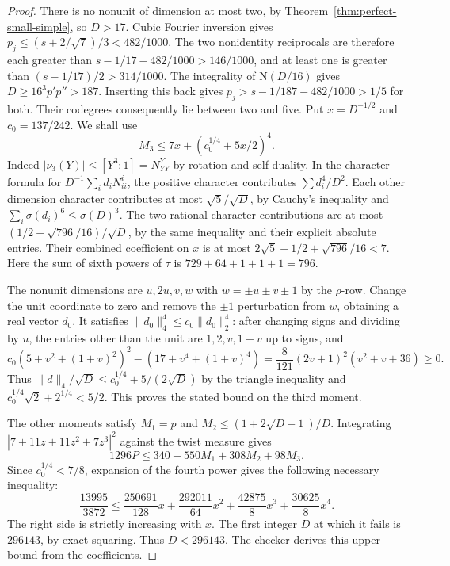 \documentclass[11pt,a4paper]{article}
\numberwithin{equation}{section}
\begin{document}
\begin{proof}
There is no nonunit of dimension at most two, by Theorem~\ref{thm:perfect-small-simple}, so $D>17$. Cubic Fourier inversion gives $p_j\le(s+2/\sqrt7)/3<482/1000$. The two nonidentity reciprocals are therefore each greater than $s-1/17-482/1000>146/1000$, and at least one is greater than $(s-1/17)/2>314/1000$. The integrality of $\mathrm N(D/16)$ gives $D\ge16^3p'p''>187$. Inserting this back gives $p_j>s-1/187-482/1000>1/5$ for both. Their codegrees consequently lie between two and five.
Put $x=D^{-1/2}$ and $c_0=137/242$. We shall use
\[
 M_3\le 7x+(c_0^{1/4}+5x/2)^4 .
\]
Indeed $|\nu_3(Y)|\le [Y^3:1]=N_{YY}^Y$ by rotation and
self-duality. In the character formula for
$D^{-1}\sum_i d_i N_{ii}^i$, the positive character contributes
$\sum d_i^4/D^2$. Each other dimension character contributes at most
$\sqrt5/\sqrt D$, by Cauchy's inequality and
$\sum_i\sigma(d_i)^6\le\sigma(D)^3$.
The two rational character contributions are at most
$(1/2+\sqrt{796}/16)/\sqrt D$, by the same inequality and their
explicit absolute entries. Their combined coefficient on $x$ is at most $2\sqrt5+1/2+\sqrt{796}/16<7$. Here the sum of sixth powers of $\tau$ is
$729+64+1+1+1=796$.

The nonunit dimensions are $u,2u,v,w$ with $w=\pm u\pm v\pm1$
by the $\rho$-row. Change the unit coordinate to zero and remove
the $\pm1$ perturbation from $w$, obtaining a real vector $d_0$.
It satisfies $\|d_0\|_4^4\le c_0\|d_0\|_2^4$:
after changing signs and dividing by $u$, the entries other than the unit are $1,2,v,1+v$ up to signs, and
\[
 c_0(5+v^2+(1+v)^2)^2-
       (17+v^4+(1+v)^4)
 =\frac8{121}(2v+1)^2(v^2+v+36)\ge0 .
\]
Thus $\|d\|_4/\sqrt D\le c_0^{1/4}+5/(2\sqrt D)$ by the
triangle inequality and $c_0^{1/4}\sqrt2+2^{1/4}<5/2$.
This proves the stated bound on the third moment.

The other moments satisfy $M_1=p$ and
$M_2\le(1+2\sqrt{D-1})/D$. Integrating
$|7+11z+11z^2+7z^3|^2$ against the twist measure gives
\[
 1296P\le340+550 M_1+308 M_2+98 M_3.
\]
Since $c_0^{1/4}<7/8$, expansion of the fourth power gives the following necessary inequality:
\[
 \frac{13995}{3872}\le
 \frac{250691}{128}x+\frac{292011}{64}x^2
 +\frac{42875}{8}x^3+\frac{30625}{8}x^4 .
\]
The right side is strictly increasing with $x$. The first integer $D$ at which it fails is $296143$, by exact squaring. Thus $D<296143$. The checker derives this upper bound from the coefficients.
 

\end{proof}
\end{document}
